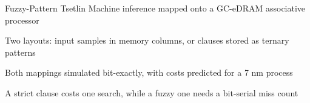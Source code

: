 \item Fuzzy-Pattern Tsetlin Machine inference mapped onto a GC-eDRAM associative processor
\item Two layouts: input samples in memory columns, or clauses stored as ternary patterns
\item Both mappings simulated bit-exactly, with costs predicted for a 7 nm process
\item A strict clause costs one search, while a fuzzy one needs a bit-serial miss count
\item {}
